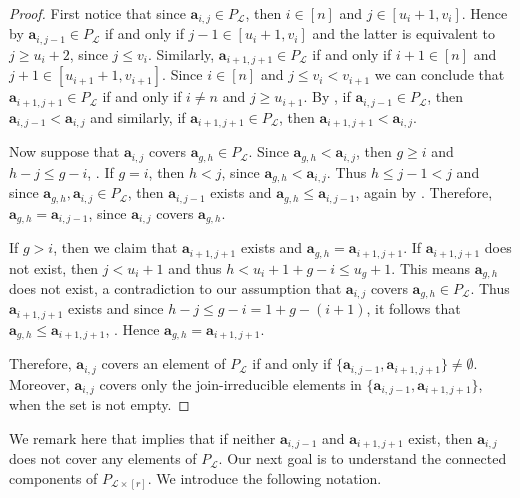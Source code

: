 \documentclass[11pt,a4paper,reqno,dvipsnames]{amsart}
\theoremstyle{plain}
\theoremstyle{definition}
\newtheorem{Assumptions and Discussion}[Theorem]{Assumptions and Discussion}
\theoremstyle{remark}
\newcommand\bda{{\bm a}}
\newcommand\calL{\mathcal{L}}
\newcommand{\Lr}{\ensuremath{\calL\times[r]}}
\begin{document}
\begin{proof}

First notice that since $\bda_{i,j}\in P_{\calL}$, then $i\in [n]$ and $j\in[u_i+1,v_i]$. Hence by  $\bda_{i,j-1}\in P_{\calL}$ if and only if $j-1\in [u_i+1, v_i]$ and  the latter is equivalent to $j\ge u_{i}+2$, since $j\le v_i$. Similarly, $\bda_{i+1, j+1}\in P_{\calL}$ if and only if $i+1\in [n]$ and $j+1\in [u_{i+1}+1, v_{i+1}]$. Since $i\in [n]$ and $j\le v_i<v_{i+1}$ we can conclude that $\bda_{i+1, j+1}\in P_{\calL}$ if and only if $i\neq n$ and $j\ge u_{i+1}$.
By , if $\bda_{i,j-1}\in P_{\calL}$, then $\bda_{i,j-1}<\bda_{i,j}$ and similarly, if $\bda_{i+1, j+1}\in P_{\calL}$, then $\bda_{i+1, j+1}<\bda_{i,j}$.

Now suppose that $\bda_{i,j}$ covers $\bda_{g,h}\in P_{\calL}$. Since $\bda_{g,h}<\bda_{i,j}$, then $g\ge i$ and $h-j\leq g-i$, . If $g=i$, then $h< j$,  since $\bda_{g,h}<\bda_{i,j}$. Thus $h \le j-1<j$ and since $\bda_{g,h}, \bda_{i,j}\in P_{\calL}$, then $\bda_{i,j-1}$ exists and $\bda_{g,h}\le \bda_{i,j-1}$, again by . Therefore, $\bda_{g,h}=\bda_{i,j-1}$, since $\bda_{i,j}$ covers $\bda_{g,h}$. 

If $g>i$, then we claim that $\bda_{i+1,j+1}$ exists and $\bda_{g,h}= \bda_{i+1,j+1}$. If $\bda_{i+1,j+1}$ does not exist, then $j<u_i+1$ and thus $h<u_i+1+g-i\le u_{g}+1$. This means $\bda_{g,h}$ does not exist, a contradiction to our assumption that $\bda_{i,j}$ covers $\bda_{g,h}\in P_{\calL}$. Thus $\bda_{i+1,j+1}$ exists and since $h-j\le g-i=1+g-(i+1)$, it follows that $\bda_{g,h}\le \bda_{i+1,j+1}$, . Hence $\bda_{g,h}=\bda_{i+1,j+1}$.


Therefore, $\bda_{i,j}$ covers an element of $P_{\calL}$ if and only if $\{\bda_{i,j-1}, \bda_{i+1,j+1}\}\neq \emptyset$. Moreover, $\bda_{i,j}$ covers only the join-irreducible elements in $\{\bda_{i,j-1}, \bda_{i+1,j+1}\}$, when the set is not empty. 
\end{proof}



 
 We remark here that  implies that if neither $\bda_{i,j-1}$ and $\bda_{i+1,j+1}$ exist, then $\bda_{i,j}$ does not cover any elements of $P_{\calL}$.
Our next goal is to understand the connected components of $P_{\Lr}$. We introduce the following notation. 
\end{document}
